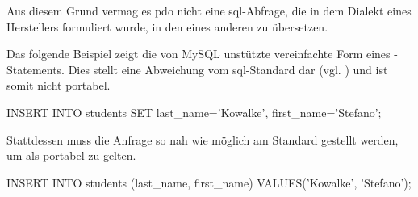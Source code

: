 Aus diesem Grund vermag es \gls{pdo} nicht eine \gls{sql}-Abfrage, die in dem Dialekt eines Herstellers formuliert wurde, in den eines anderen zu übersetzen.

Das folgende Beispiel zeigt die von MySQL unstützte vereinfachte Form eines -Statements. Dies stellt eine Abweichung vom \gls{sql}-Standard dar (vgl. \cite[S. 388]{website:SQLStandard1992}) und ist somit nicht portabel.

\begin{listing}[H]
\begin{mysqlcode}
INSERT INTO students SET last_name='Kowalke', first_name='Stefano';
\end{mysqlcode}
\caption{}
\label{lst:notPortableSQL}
\end{listing}

Stattdessen muss die Anfrage so nah wie möglich am Standard gestellt werden, um als portabel zu gelten.

\begin{listing}[H]
\begin{mysqlcode}
INSERT INTO students (last_name, first_name) VALUES('Kowalke', 'Stefano');
\end{mysqlcode}
\caption{}
\label{lst:portableSQL}
\end{listing}
